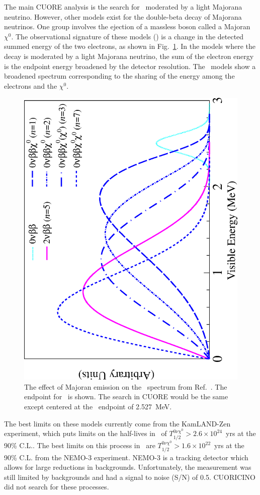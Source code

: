 The main CUORE analysis is the search for \zeronu~moderated by a light Majorana neutrino.  However, other models exist for the double-beta decay of Majorana neutrinos. One group involves the ejection of a massless boson called a Majoran $\chi^{0}$. The observational signature of these models (\maj) is a change in the detected summed energy of the two electrons, as shown in Fig.~\ref{majoran}.  In the models where the decay is moderated by a light Majorana neutrino, the sum of the electron energy is the endpoint energy broadened by the detector resolution. The \maj~models show a broadened spectrum corresponding to the sharing of the energy among the electrons and the $\chi^{0}$. 

\begin{figure}
\begin{center}
\includegraphics[angle=270, width=0.58\columnwidth]{fig1} 
\end{center}
\caption{\label{majoran}The effect of Majoran emission on the \zeronu~spectrum from Ref.~\cite{KZMaj}. The endpoint for \isoxe~is shown. The search in CUORE would be the same except centered at the \isomain~endpoint of 2.527~MeV. }
\end{figure}

The best limits on these models currently come from the KamLAND-Zen experiment, which puts limits on the half-lives in \isoxe~of $T_{1/2}^{0\nu\chi^0}>2.6\times10^{24}$~yrs at the 90\% C.L.\cite{KZMaj}. The best limits on this process in \isomain~are $T_{1/2}^{0\nu\chi^0}>1.6\times10^{22}$~yrs at the 90\% C.L. from the NEMO-3 experiment\cite{nemo3Te}. NEMO-3 is a tracking detector which allows for large reductions in backgrounds. Unfortunately, the measurement was still limited by backgrounds and had a signal to noise (S/N) of 0.5. CUORICINO did not search for these processes.

